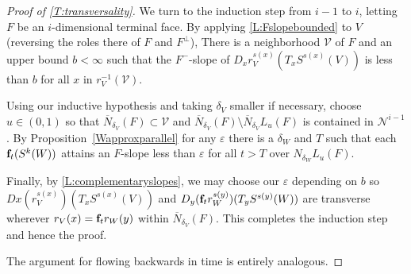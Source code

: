 \begin{proof}[Proof of \cref{T:transversality}]
	We turn to  the induction step  from $i-1$ to $i$, letting $F$ be an $i$-dimensional terminal face.
	By applying \cref{L:Fslopebounded} to $V$ (reversing the roles there of $F$ and $F^\perp$),
	There is a neighborhood $\mathcal{V}$ of $F$ and an upper bound $b < \infty$ such that
	the $F^-$-slope of $D_xr^{s(x)}_V(T_xS^{s(x)}(V))$ is less than $b$ for all $x$ in $r_V^{-1}(\mathcal{V})$.


	Using our inductive hypothesis and taking $\delta_V$ smaller if necessary, choose $u \in (0, 1)$  so that $\overline N_{\delta_V}(F) \subset \mathcal{V}$ and $\overline N_{\delta_V}(F) \setminus \overline N_{\delta_V} L_u(F)$ is contained in $\mathcal N^{i-1}$.
	By Proposition~\ref{Wapproxparallel} for any $\varepsilon$  there is a $\delta_W$ and $T$
	such that each $\mathbf{f}_t(S^k(W))$ attains an $F$-slope less than  $\varepsilon$  for all $t>T$ over $N_{\delta_W} L_u(F)$.

	Finally, by \cref{L:complementaryslopes}, we may choose our $\varepsilon$ depending on $b$ so   $Dx(r^{s(x)}_V)(T_xS^{s(x)}(V))$ and $D_y(\mathbf{f}_tr^{s(y)}_W)(T_yS^{s(y)}(W))$ are transverse wherever $r_V(x) = \mathbf{f}_tr_W(y)$ within $\overline N_{\delta_V}(F)$.
	This completes the induction step and hence the proof.

	The argument for flowing backwards in time is entirely analogous.
\end{proof}


